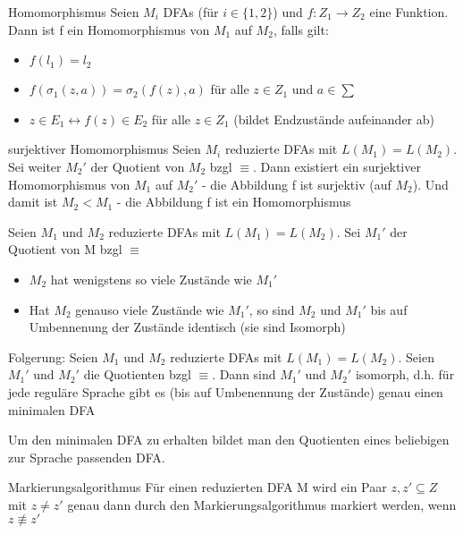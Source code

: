 \documentclass[avery5371]{flashcards}
\begin{document}
\begin{flashcard}[Definition]{Homomorphismus}
     Seien $M_i$ DFAs (für $i\in\{1,2\}$) und $f:Z_1 \rightarrow Z_2$ eine Funktion. Dann ist f ein Homomorphismus von $M_1$ auf $M_2$, falls gilt:
\begin{itemize}
\item $f(l_1)=l_2$
\item $f(\sigma_1(z,a))=\sigma_2(f(z),a)$ für alle $z\in Z_1$ und $a\in \sum$
\item $z\in E_1 \leftrightarrow f(z)\in E_2$ für alle $z\in Z_1$ (bildet Endzustände aufeinander ab)
\end{itemize}
\end{flashcard}

\begin{flashcard}[Satz]{surjektiver Homomorphismus}
     Seien $M_i$ reduzierte DFAs mit $L(M_1)=L(M_2)$. Sei weiter $M_2'$ der Quotient von $M_2$ bzgl $\equiv$. Dann existiert ein surjektiver Homomorphismus von $M_1$ auf $M_2'$
- die Abbildung f ist surjektiv (auf $M_2$). Und damit ist $M_2 < M_1$
- die Abbildung f ist ein Homomorphismus
\end{flashcard}

\begin{flashcard}[Satz]{ Seien $M_1$ und $M_2$ reduzierte DFAs mit $L(M_1)=L(M_2)$. Sei $M_1'$ der Quotient von M bzgl $\equiv$}\begin{itemize}
\item $M_2$ hat wenigstens so viele Zustände wie $M_1'$
\item Hat $M_2$ genauso viele Zustände wie $M_1'$, so sind $M_2$ und $M_1'$ bis auf Umbennenung der Zustände identisch (sie sind Isomorph)
\end{itemize}

Folgerung: Seien $M_1$ und $M_2$ reduzierte DFAs mit $L(M_1)=L(M_2)$. Seien $M_1'$ und $M_2'$ die Quotienten bzgl $\equiv$. Dann sind $M_1'$ und $M_2'$ isomorph, d.h. für jede reguläre Sprache gibt es (bis auf Umbenennung der Zustände) genau einen minimalen DFA

Um den minimalen DFA zu erhalten bildet man den Quotienten eines beliebigen zur Sprache passenden DFA.
\end{flashcard}

\begin{flashcard}[Satz]{Markierungsalgorithmus} Für einen reduzierten DFA M wird ein Paar ${z,z'}\subseteq Z$ mit $z\not = z'$ genau dann durch den Markierungsalgorithmus markiert werden, wenn $z\not \equiv z'$
\end{flashcard}
\end{document}
